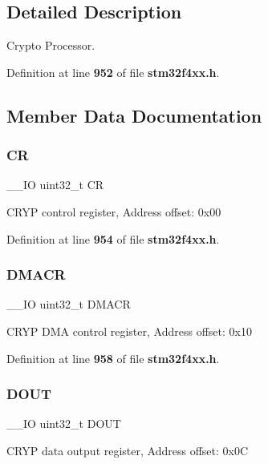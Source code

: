 \subsection{Detailed Description}
Crypto Processor. 

Definition at line \textbf{ 952} of file \textbf{ stm32f4xx.\+h}.



\subsection{Member Data Documentation}
\mbox{\label{structCRYP__TypeDef_ab40c89c59391aaa9d9a8ec011dd0907a}} 
\subsubsection{CR}
{\footnotesize\ttfamily \+\_\+\+\_\+\+IO uint32\+\_\+t CR}

C\+R\+YP control register, Address offset\+: 0x00 

Definition at line \textbf{ 954} of file \textbf{ stm32f4xx.\+h}.

\mbox{\label{structCRYP__TypeDef_a082219a924d748e9c6092582aec06226}} 
\subsubsection{D\+M\+A\+CR}
{\footnotesize\ttfamily \+\_\+\+\_\+\+IO uint32\+\_\+t D\+M\+A\+CR}

C\+R\+YP D\+MA control register, Address offset\+: 0x10 

Definition at line \textbf{ 958} of file \textbf{ stm32f4xx.\+h}.

\mbox{\label{structCRYP__TypeDef_ab8ba768d1dac54a845084bd07f4ef2b9}} 
\subsubsection{D\+O\+UT}
{\footnotesize\ttfamily \+\_\+\+\_\+\+IO uint32\+\_\+t D\+O\+UT}

C\+R\+YP data output register, Address offset\+: 0x0C 

